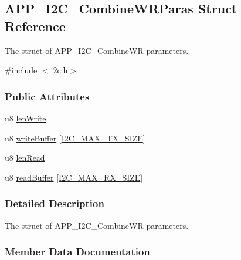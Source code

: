 \hypertarget{struct_a_p_p___i2_c___combine_w_r_paras}{}\subsection{A\+P\+P\+\_\+\+I2\+C\+\_\+\+Combine\+W\+R\+Paras Struct Reference}
\label{struct_a_p_p___i2_c___combine_w_r_paras}


The struct of A\+P\+P\+\_\+\+I2\+C\+\_\+\+Combine\+WR parameters.  




{\ttfamily \#include $<$i2c.\+h$>$}

\subsubsection*{Public Attributes}
\begin{DoxyCompactItemize}
\item 
u8 \hyperlink{struct_a_p_p___i2_c___combine_w_r_paras_ac2f77c738ca7a2f41654d19f3acd95c3}{len\+Write}
\item 
u8 \hyperlink{struct_a_p_p___i2_c___combine_w_r_paras_a016f5b3f5ca9cdc868d40e627c48bb7b}{write\+Buffer} \mbox{[}\hyperlink{group___i2_c___m_a_x___s_i_z_e___d_e_f_ga7f177b43ed9acb3a242d59bb0634d472}{I2\+C\+\_\+\+M\+A\+X\+\_\+\+T\+X\+\_\+\+S\+I\+ZE}\mbox{]}
\item 
u8 \hyperlink{struct_a_p_p___i2_c___combine_w_r_paras_a7e88ca41c78d7d5cbb418c54c324ca3c}{len\+Read}
\item 
u8 \hyperlink{struct_a_p_p___i2_c___combine_w_r_paras_a776fa5eb024d92048f721aab001a01a9}{read\+Buffer} \mbox{[}\hyperlink{group___i2_c___m_a_x___s_i_z_e___d_e_f_gad2b555d7882359c024c831c844d28f69}{I2\+C\+\_\+\+M\+A\+X\+\_\+\+R\+X\+\_\+\+S\+I\+ZE}\mbox{]}
\end{DoxyCompactItemize}


\subsubsection{Detailed Description}
The struct of A\+P\+P\+\_\+\+I2\+C\+\_\+\+Combine\+WR parameters. 

\subsubsection{Member Data Documentation}
